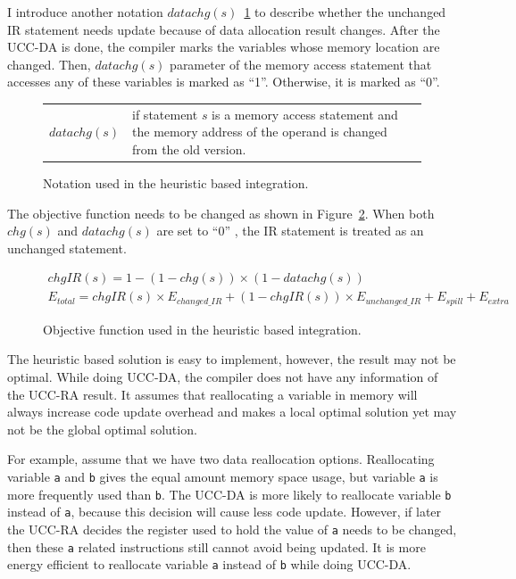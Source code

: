 I introduce another notation $datachg(s)$~\ref{notation2} to describe whether the unchanged IR
statement needs update because of data allocation result changes. After the UCC-DA is done, the compiler marks the variables whose memory location are changed. Then, $datachg(s)$ parameter of the memory access statement that accesses any of these variables is marked as ``1''. Otherwise, it is marked as ``0''.
\begin{figure}[htbp]
\begin{normalsize}
\begin{center}
\begin{tabular}{r|p{5in}} 
$datachg(s)$ & if statement $s$ is a memory access statement and the memory address of the operand is changed
from the old version.
\end{tabular}
\caption{ Notation used in the heuristic based integration.}
\label{notation2}
\end{center}
\end{normalsize}
\end{figure}

The objective function needs to be changed as shown in Figure~\ref{newObj}. When both $chg(s)$ and $datachg(s)$ are set to ``0'' , the IR statement is treated as an unchanged statement.
\begin{figure}[ht]
\begin{small}
\begin{eqnarray}
chgIR(s) =1-(1-chg(s))\times(1-datachg(s))\\ 
E_{total} = 
chgIR(s) \times E_{changed\_IR} + (1-chgIR(s))\times E_{unchanged\_IR} +
E_{spill} + E_{extra} 
\end{eqnarray}
\end{small}
\caption{Objective function used in the heuristic based integration.}
\label{newObj}
\end{figure}

The heuristic based solution is easy to implement, however, the result may not be optimal.
While doing UCC-DA, the compiler does not have any information of the UCC-RA result.
It assumes that reallocating a variable in memory will always increase 
code update overhead and makes a local optimal solution yet may not be the global
optimal solution.

For example, assume that we have two data reallocation options. Reallocating variable
{\tt a} and {\tt b} gives the equal amount memory space usage, but variable {\tt a}
is more frequently used than {\tt b}. The UCC-DA is more likely to reallocate variable
{\tt b} instead of {\tt a}, because this decision will cause less code update.
However, if later the UCC-RA decides the register used to hold the value of {\tt a}
needs to be changed, then these {\tt a} related instructions still cannot
avoid being updated. It is more energy efficient to reallocate variable {\tt a} instead
of {\tt b} while doing UCC-DA.


